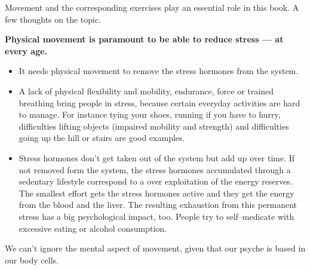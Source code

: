 \documentclass[../Book.Stress_regulation.tex]{subfiles}
\begin{document}
Movement and the corresponding exercises play an essential role in this book. %
A few thoughts on the topic.

\noindent\textbf{Physical movement is paramount to be able to {reduce stress} --- at {every age}.}

\begin{itemize}
\item It needs physical movement to {remove the stress hormones} from the system.
\item A lack of physical flexibility and mobility, endurance, force or trained breathing bring people in stress, because certain everyday activities are hard to manage.
  For instance tying your shoes, running if you have to hurry, difficulties lifting objects (impaired mobility and strength)
  and difficulties going up the hill or stairs are good examples.
  \item Stress hormones don't get taken out of the system but add up over time. 
If not removed form the system, the {stress hormones accumulated} through a sedentary lifestyle correspond to a {over exploitation of the energy reserves}.
The {smallest effort gets the stress hormones active} and they get the energy from the blood and the liver.
The resulting {exhaustion} from this permanent stress has a big {psychological impact}, too.
People try to self--medicate with {excessive eating or alcohol consumption}.
\end{itemize}

\newpage
\noindent We can't ignore the mental aspect of movement, given that our psyche is based in our body cells.
\end{document}
